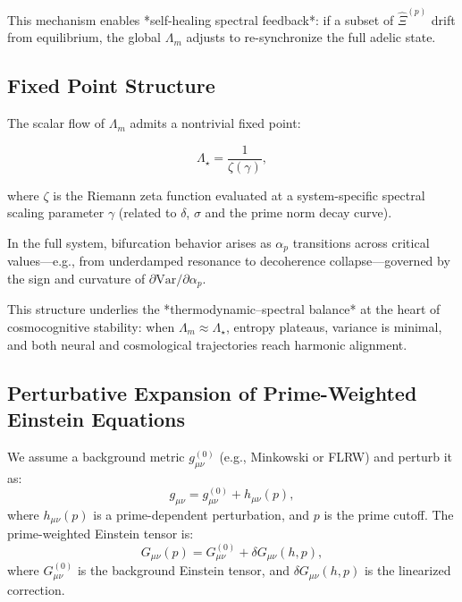 \documentclass[12pt]{article}
\theoremstyle{plain}
\begin{document}
This mechanism enables *self-healing spectral feedback*: if a subset of $\hat{\Xi}^{(p)}$ drift from equilibrium, the global $\Lambda_m$ adjusts to re-synchronize the full adelic state.

\subsection{Fixed Point Structure}

The scalar flow of $\Lambda_m$ admits a nontrivial fixed point:

\begin{equation}
\Lambda_\star = \frac{1}{\zeta(\gamma)},
\end{equation}

where $\zeta$ is the Riemann zeta function evaluated at a system-specific spectral scaling parameter $\gamma$ (related to $\delta$, $\sigma$ and the prime norm decay curve).

In the full system, bifurcation behavior arises as $\alpha_p$ transitions across critical values—e.g., from underdamped resonance to decoherence collapse—governed by the sign and curvature of $\partial \text{Var}/\partial \alpha_p$.

\vspace{0.5em}

This structure underlies the *thermodynamic–spectral balance* at the heart of cosmocognitive stability: when $\Lambda_m \approx \Lambda_\star$, entropy plateaus, variance is minimal, and both neural and cosmological trajectories reach harmonic alignment.

\subsection*{Perturbative Expansion of Prime-Weighted Einstein Equations}

We assume a background metric \( g_{\mu\nu}^{(0)} \) (e.g., Minkowski or FLRW) and perturb it as:
\begin{equation}
g_{\mu\nu} = g_{\mu\nu}^{(0)} + h_{\mu\nu}(p),
\end{equation}
where \( h_{\mu\nu}(p) \) is a prime-dependent perturbation, and \( p \) is the prime cutoff. The prime-weighted Einstein tensor is:
\begin{equation}
G_{\mu\nu}(p) = G_{\mu\nu}^{(0)} + \delta G_{\mu\nu}(h, p),
\end{equation}
where \( G_{\mu\nu}^{(0)} \) is the background Einstein tensor, and \( \delta G_{\mu\nu}(h, p) \) is the linearized correction.
\end{document}
